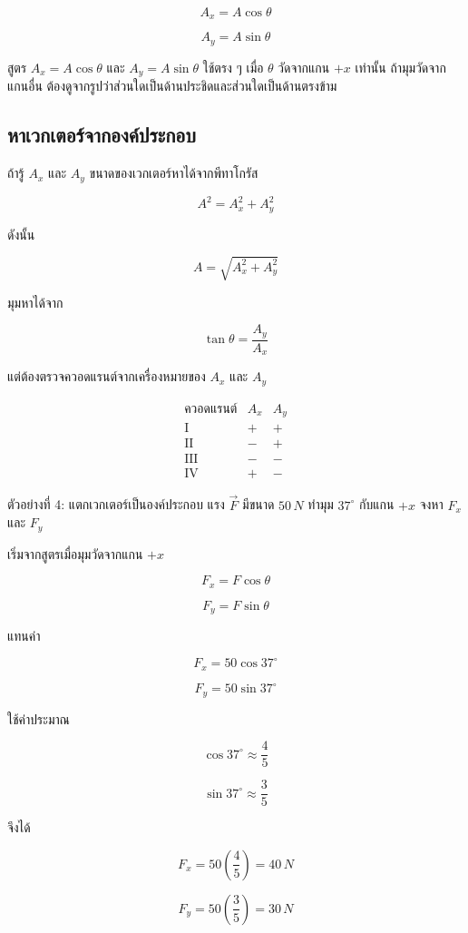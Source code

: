 \begin{tcolorbox}[title={สูตรแตกเวกเตอร์เมื่อมุมวัดจากแกนบวก x}]
\[
A_x=A\cos\theta
\]

\[
A_y=A\sin\theta
\]
\end{tcolorbox}

\begin{tcolorbox}[title=ระวัง]
สูตร $A_x=A\cos\theta$ และ $A_y=A\sin\theta$ ใช้ตรง ๆ เมื่อ $\theta$ วัดจากแกน $+x$ เท่านั้น ถ้ามุมวัดจากแกนอื่น ต้องดูจากรูปว่าส่วนใดเป็นด้านประชิดและส่วนใดเป็นด้านตรงข้าม
\end{tcolorbox}

\subsection{หาเวกเตอร์จากองค์ประกอบ}

ถ้ารู้ $A_x$ และ $A_y$ ขนาดของเวกเตอร์หาได้จากพีทาโกรัส

\[
A^2=A_x^2+A_y^2
\]

ดังนั้น

\[
A=\sqrt{A_x^2+A_y^2}
\]

มุมหาได้จาก

\[
\tan\theta=\frac{A_y}{A_x}
\]

แต่ต้องตรวจควอดแรนต์จากเครื่องหมายของ $A_x$ และ $A_y$

\begin{tcolorbox}[title=เครื่องหมายขององค์ประกอบ]
\[
\begin{array}{c|c|c}
\text{ควอดแรนต์} & A_x & A_y\\
\hline
\text{I} & + & +\\
\text{II} & - & +\\
\text{III} & - & -\\
\text{IV} & + & -
\end{array}
\]
\end{tcolorbox}

\begin{examplebox}{ตัวอย่างที่ 4: แตกเวกเตอร์เป็นองค์ประกอบ}
แรง $\vec{F}$ มีขนาด $50\,\si{N}$ ทำมุม $37^\circ$ กับแกน $+x$ จงหา $F_x$ และ $F_y$

เริ่มจากสูตรเมื่อมุมวัดจากแกน $+x$

\[
F_x=F\cos\theta
\]

\[
F_y=F\sin\theta
\]

แทนค่า

\[
F_x=50\cos37^\circ
\]

\[
F_y=50\sin37^\circ
\]

ใช้ค่าประมาณ

\[
\cos37^\circ\approx \frac{4}{5}
\]

\[
\sin37^\circ\approx \frac{3}{5}
\]

จึงได้

\[
F_x=50\left(\frac{4}{5}\right)=40\,\si{N}
\]

\[
F_y=50\left(\frac{3}{5}\right)=30\,\si{N}
\]
\end{examplebox}

